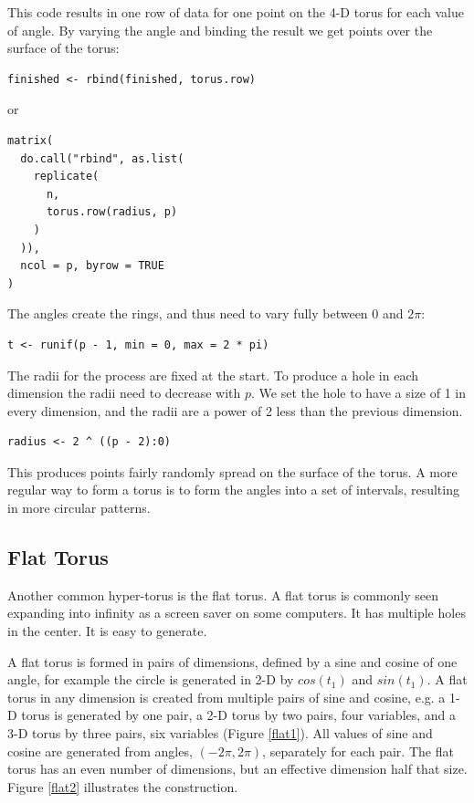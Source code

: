 This code results in one row of data for one point on the 4-D torus
for each value of angle.  By varying the angle and binding the result
we get points over the surface of the torus:

\begin{verbatim}
finished <- rbind(finished, torus.row)
\end{verbatim}

or

\begin{verbatim}
matrix(
  do.call("rbind", as.list(
    replicate(
      n,
      torus.row(radius, p)
    )
  )),
  ncol = p, byrow = TRUE
)
\end{verbatim}

The angles create the rings, and thus need to vary fully between 0 and
$2\pi$:

\begin{verbatim}
t <- runif(p - 1, min = 0, max = 2 * pi)
\end{verbatim}

The radii for the process are fixed at the start.  To produce a hole
in each dimension the radii need to decrease with $p$.  We set the
hole to have a size of 1 in every dimension, and the radii are a power
of 2 less than the previous dimension.

\begin{verbatim}
radius <- 2 ^ ((p - 2):0)
\end{verbatim}

\noindent This produces points fairly randomly spread on the surface of
the torus.  A more regular way to form a torus is to form the angles
into a set of intervals, resulting in more circular patterns.

\subsection{Flat Torus}

Another common hyper-torus is the flat torus. A flat torus is commonly
seen expanding into infinity as a screen saver on some computers. It
has multiple holes in the center. It is easy to generate.

A flat torus is formed in pairs of dimensions, defined by a sine and
cosine of one angle, for example the circle is generated in 2-D by
$cos(t_1)$ and $sin(t_1)$.  A flat torus in any dimension is created
from multiple pairs of sine and cosine, e.g. a 1-D torus is generated by
one pair, a 2-D torus by two pairs, four variables, and a 3-D torus by
three pairs, six variables (Figure \ref{flat1}).  All values of sine
and cosine are generated from angles, $(-2\pi, 2\pi)$, separately for
each pair.  The flat torus has an even number of dimensions, but an
effective dimension half that size. Figure \ref{flat2} illustrates the
construction.

